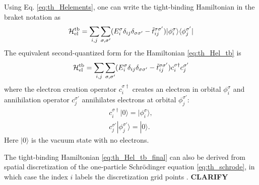 Using Eq. \eqref{eq:th_Helements}, one can write the tight-binding Hamiltonian in the braket notation \cite{schwabl} as 
\begin{equation}
 \mathcal{H}_{\textrm{el}}^{\textrm{tb}} = \sum_{i,j} \sum_{\sigma,\sigma'} (E_i^{\sigma} \delta_{ij}\delta_{\sigma\sigma'}  - \tilde t_{ij}^{\sigma\sigma'})|\phi_i^{\sigma} \rangle \langle \phi_j^{\sigma'} | \label{eq:th_Hel_tb}
\end{equation}
The equivalent second-quantized form \cite{schwabl} for the Hamiltonian \eqref{eq:th_Hel_tb} is
\begin{equation}
 \mathcal{H}_{\textrm{el}}^{\textrm{tb}} = \sum_{i,j} \sum_{\sigma,\sigma'} (E_i^{\sigma} \delta_{ij}\delta_{\sigma\sigma'}  - \tilde t_{ij}^{\sigma\sigma'}) c_i^{\sigma\dagger} c_j^{\sigma'} \label{eq:th_Hel_tb_final}
\end{equation}
where the electron creation operator $c_i^{\sigma\dagger}$ creates an electron in orbital $\phi_i^{\sigma}$ and annihilation operator $c_j^{\sigma'}$ annihilates electrons at orbital $\phi_j^{\sigma'}$:
 \begin{subequations}
  \begin{align} 
     c_i^{\sigma\dagger} |0 \rangle = | \phi_i^{\sigma} \rangle,  \\
     c_j^{\sigma'} |\phi_j^{\sigma'} \rangle = | 0 \rangle.
  \end{align}
 \end{subequations}
Here $|0\rangle$ is the vacuum state with no electrons. 

The tight-binding Hamiltonian \eqref{eq:th_Hel_tb_final} can also be derived from spatial discretization of the one-particle Schr\"odinger equation \eqref{eq:th_schrode}, in which case the index $i$ labels the discretization grid points \cite{datta}. \textbf{CLARIFY}




